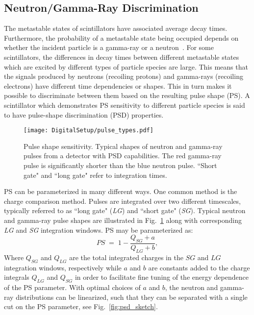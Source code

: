 \documentclass[main.tex]{subfiles}
\begin{document}
\subsection{Neutron/Gamma-Ray Discrimination}\label{sec:psd}
The metastable states of scintillators have associated average decay times. 
Furthermore, the probability of a metastable state being occupied depends on whether the incident particle is a gamma-ray or a neutron~\cite{Krane}. For some scintillators, the differences in decay times between different metastable states which are excited by different types of particle species are large. This means that the signals produced by neutrons (recoiling protons) and gamma-rays (recoiling electrons) have different time dependencies or shapes. This in turn makes it possible to discriminate between them based on the resulting pulse shape (PS). A scintillator which demonstrates PS sensitivity to different particle species is said to have pulse-shape discrimination (PSD) properties.
\begin{figure}[ht]
	\centering
    	\texttt{[image: DigitalSetup/pulse\_types.pdf]}
        \caption[Pulse shape sensitivity.]{Pulse shape sensitivity. Typical shapes of neutron and gamma-ray pulses from a detector with PSD capabilities. The red gamma-ray pulse is significantly shorter than the blue neutron pulse. ``Short gate" and ``long gate" refer to integration times.}
	    \label{fig:pulse_types} 
\end{figure}

PS can be parameterized in many different ways. One common method is the charge comparison method. Pulses are integrated over two different timescales, typically referred to as ``long gate" (\textit{LG}) and ``short gate" (\textit{SG}). Typical neutron and gamma-ray pulse shapes are illustrated in Fig.~\ref{fig:pulse_types} along with corresponding \textit{LG} and \textit{SG} integration windows. PS may be parameterized as:
\begin{equation}
	PS \; = \; 1-\frac{Q_{SG} + a}{Q_{LG} + b},
	\label{eq:ps}
\end{equation}
Where $Q_{SG}$ and $Q_{LG}$ are the total integrated charges in the $SG$ and $LG$ integration windows, respectively while $a$ and $b$ are constants added to the charge integrals $Q_{LG}$ and $Q_{SG}$ in order to facilitate fine tuning of the energy dependence of the PS parameter. 
With optimal choices of $a$ and $b$, the neutron and gamma-ray distributions can be linearized, such that they can be separated with a single cut on the PS parameter, see Fig.~\ref{fig:psd_sketch}.
\end{document}
